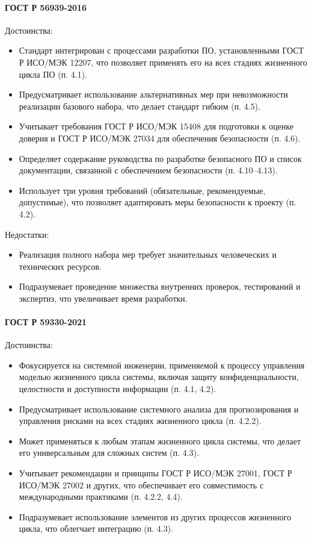 \paragraph{ГОСТ Р 56939-2016}

Достоинства:

\begin{itemize}
	\item Стандарт интегрирован с процессами разработки ПО,
		установленными ГОСТ Р ИСО/МЭК 12207,
		что позволяет применять его
		на всех стадиях жизненного цикла ПО (п. 4.1).
	\item Предусматривает использование альтернативных мер
		при невозможности реализации базового набора,
		что делает стандарт гибким (п. 4.5).
	\item Учитывает требования ГОСТ Р ИСО/МЭК 15408
		для подготовки к оценке доверия и ГОСТ Р ИСО/МЭК 27034
		для обеспечения безопасности (п. 4.6).
	\item Определяет содержание руководства по разработке безопасного ПО
		и список документации,
		связанной с обеспечением безопасности (п. 4.10–4.13).
	\item Использует три уровня требований
		(обязательные, рекомендуемые, допустимые),
		что позволяет адаптировать меры безопасности к проекту (п. 4.2).
\end{itemize}

Недостатки:

\begin{itemize}
	\item Реализация полного набора мер требует значительных человеческих
		и технических ресурсов.
	\item Подразумевает проведение множества внутренних проверок,
		тестирований и экспертиз, что увеличивает время разработки.
\end{itemize}

\paragraph{ГОСТ Р 59330-2021}

Достоинства:

\begin{itemize}
	\item Фокусируется на системной инженерии,
		применяемой к процессу управления моделью жизненного цикла системы,
		включая защиту конфиденциальности,
		целостности и доступности информации (п. 4.1, 4.2).
	\item Предусматривает использование системного анализа для прогнозирования
		и управления рисками на всех стадиях жизненного цикла (п. 4.2.2).
	\item Может применяться к любым этапам жизненного цикла системы,
		что делает его универсальным для сложных систем (п. 4.3).
	\item Учитывает рекомендации и принципы ГОСТ Р ИСО/МЭК 27001,
		ГОСТ Р ИСО/МЭК 27002 и других,
		что обеспечивает его совместимость
		с международными практиками (п. 4.2.2, 4.4).
	\item Подразумевает использование элементов
		из других процессов жизненного цикла,
		что облегчает интеграцию (п. 4.3).
\end{itemize}

